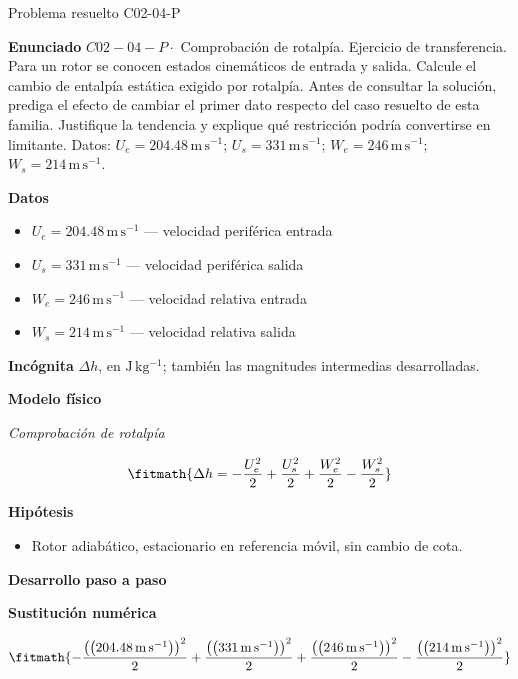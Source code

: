 \documentclass[10pt,openany]{book}
\begin{document}
\begin{studiumworked}{Problema resuelto C02-04-P}


\noindent\textbf{Enunciado}
\(C02-04-P \cdot\) Comprobación de rotalpía. Ejercicio de transferencia. Para un rotor se conocen estados cinemáticos de entrada y salida. Calcule el cambio de entalpía estática exigido por rotalpía. Antes de consultar la solución, prediga el efecto de cambiar el primer dato respecto del caso resuelto de esta familia. Justifique la tendencia y explique qué restricción podría convertirse en limitante. Datos: \(U_e=204.48\, \mathrm{m}\,\mathrm{s}^{-1}\); \(U_s=331\, \mathrm{m}\,\mathrm{s}^{-1}\); \(W_e=246\, \mathrm{m}\,\mathrm{s}^{-1}\); \(W_s=214\, \mathrm{m}\,\mathrm{s}^{-1}\).

\noindent\textbf{Datos}
\begin{itemize}
\item $U_e = 204.48\,\mathrm{m}\,\mathrm{s}^{-1}$ — velocidad periférica entrada
\item $U_s = 331\,\mathrm{m}\,\mathrm{s}^{-1}$ — velocidad periférica salida
\item $W_e = 246\,\mathrm{m}\,\mathrm{s}^{-1}$ — velocidad relativa entrada
\item $W_s = 214\,\mathrm{m}\,\mathrm{s}^{-1}$ — velocidad relativa salida
\end{itemize}

\noindent\textbf{Incógnita}
$\Delta h$, en $\mathrm{J\,kg^{-1}}$; también las magnitudes intermedias desarrolladas.

\noindent\textbf{Modelo físico}

\noindent\textit{Comprobación de rotalpía}

\[
\fitmath{\Delta h=- \frac{U_e^{2}}{2} + \frac{U_s^{2}}{2} + \frac{W_e^{2}}{2} - \frac{W_s^{2}}{2}}
\]

\noindent\textbf{Hipótesis}
\begin{itemize}
\item Rotor adiabático, estacionario en referencia móvil, sin cambio de cota.
\end{itemize}

\noindent\textbf{Desarrollo paso a paso}



\noindent\textbf{Sustitución numérica}

\[
\fitmath{- \frac{\left(\left(204.48\,\mathrm{m}\,\mathrm{s}^{-1}\right)\right)^{2}}{2} + \frac{\left(\left(331\,\mathrm{m}\,\mathrm{s}^{-1}\right)\right)^{2}}{2} + \frac{\left(\left(246\,\mathrm{m}\,\mathrm{s}^{-1}\right)\right)^{2}}{2} - \frac{\left(\left(214\,\mathrm{m}\,\mathrm{s}^{-1}\right)\right)^{2}}{2}}
\]


\end{studiumworked}
\end{document}

